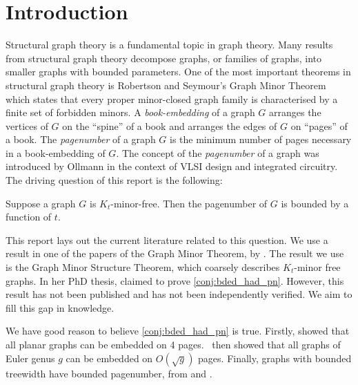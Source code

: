 \chapter{Introduction}\label{sec:introduction}
Structural graph theory is a fundamental topic in graph theory. Many results from structural graph theory decompose graphs, or families of graphs, into smaller graphs with bounded parameters. One of the most important theorems in structural graph theory is Robertson and Seymour's Graph Minor Theorem \cite{robertsonGraphMinorsXX2004} which states that every proper minor-closed graph family is characterised by a finite set of forbidden minors.
A \textit{book-embedding} of a graph $G$ arranges the vertices of $G$ on the ``spine'' of a book and arranges the edges of $G$ on ``pages'' of a book. The \textit{pagenumber} of a graph \(G\) is the minimum number of pages necessary in a book-embedding of \(G\). The concept of the \textit{pagenumber} of a graph was introduced by Ollmann \cite{ollmannBookThicknessVarious1973} in the context of VLSI design and integrated circuitry. 
The driving question of this report is the following:
\begin{conjecture}\label{conj:bded_had_pn}
	Suppose a graph $G$ is $K_t$-minor-free. Then the pagenumber of \(G\) is bounded by a function of \(t\).
\end{conjecture}
This report lays out the current literature related to this question. We use a result in one of the papers of the Graph Minor Theorem, by \textcite{robertsonGraphMinorsXVI2003}. The result we use is the Graph Minor Structure Theorem, which coarsely describes $K_t$-minor free graphs.
In her PhD thesis, \textcite{Blankenship-PhD03} claimed to prove \cref{conj:bded_had_pn}. However, this result has not been published and has not been independently verified. We aim to fill this gap in knowledge.

We have good reason to believe \cref{conj:bded_had_pn} is true. Firstly, \textcite{yannakakisEmbeddingPlanarGraphs1989} showed that all planar graphs can be embedded on 4 pages.\ \textcite{malitzGenusGraphsHave1994} then showed that all graphs of Euler genus $g$ can be embedded on $O(\sqrt{g})$ pages. Finally, graphs with bounded treewidth have bounded pagenumber, from \textcite{ganleyPagenumberTrees2001} and \textcite{dujmovicGraphTreewidthGeometric2007}.
